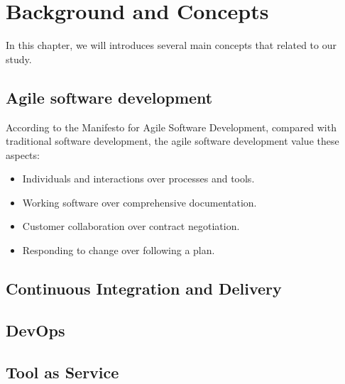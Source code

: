 \chapter{Background and Concepts}
In this chapter, we will introduces several main concepts that related to our study.
\section{Agile software development}
According to the  Manifesto for Agile Software Development, compared with traditional software development, the agile software development value these aspects: \cite{beck2001manifesto}
\begin{itemize}
\item Individuals and interactions over processes and tools.
\item Working software over comprehensive documentation.
\item Customer collaboration over contract negotiation.
\item Responding to change over following a plan.
\end{itemize}
\section{Continuous Integration and Delivery}
\section{DevOps}
\section{Tool as Service}
